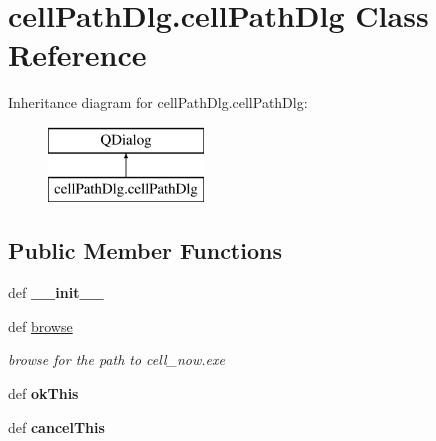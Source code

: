 \hypertarget{classcellPathDlg_1_1cellPathDlg}{\section{cell\-Path\-Dlg.\-cell\-Path\-Dlg Class Reference}
\label{classcellPathDlg_1_1cellPathDlg}
}
Inheritance diagram for cell\-Path\-Dlg.\-cell\-Path\-Dlg\-:\begin{figure}[H]
\begin{center}
\leavevmode
\includegraphics[height=2.000000cm]{classcellPathDlg_1_1cellPathDlg}
\end{center}
\end{figure}
\subsection*{Public Member Functions}
\begin{DoxyCompactItemize}
\item 
\hypertarget{classcellPathDlg_1_1cellPathDlg_aa93992b693c48d47887af3223b221cec}{def {\bfseries \-\_\-\-\_\-init\-\_\-\-\_\-}}\label{classcellPathDlg_1_1cellPathDlg_aa93992b693c48d47887af3223b221cec}

\item 
\hypertarget{classcellPathDlg_1_1cellPathDlg_a13c901781f5bcd4ee0593f0f15345c07}{def \hyperlink{classcellPathDlg_1_1cellPathDlg_a13c901781f5bcd4ee0593f0f15345c07}{browse}}\label{classcellPathDlg_1_1cellPathDlg_a13c901781f5bcd4ee0593f0f15345c07}

\begin{DoxyCompactList}\small\item\em browse for the path to cell\-\_\-now.\-exe \end{DoxyCompactList}\item 
\hypertarget{classcellPathDlg_1_1cellPathDlg_afb506c89586cc5ebc7d4dc91fede7f20}{def {\bfseries ok\-This}}\label{classcellPathDlg_1_1cellPathDlg_afb506c89586cc5ebc7d4dc91fede7f20}

\item 
\hypertarget{classcellPathDlg_1_1cellPathDlg_a15982d7e1a6ee5a1eb0f34482ba037ec}{def {\bfseries cancel\-This}}\label{classcellPathDlg_1_1cellPathDlg_a15982d7e1a6ee5a1eb0f34482ba037ec}

\end{DoxyCompactItemize}
